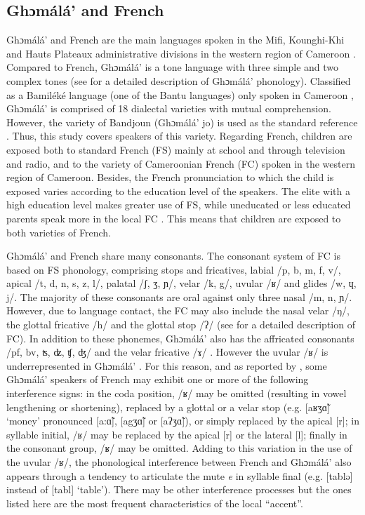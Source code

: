 \documentclass[output=paper,newtxmath,modfonts,nonflat,draftmode]{langsci/langscibook}
\begin{document}
\subsection{Ghɔmálá’ and French} %

Ghɔmálá’ and French are the main languages spoken in the Mifi, Kounghi-Khi and Hauts Plateaux administrative divisions in the western region of Cameroon \citep{Breton1991}. Compared to French, Ghɔmálá’ is a tone language with three simple and two complex tones (see \citet{Nissim1981} for a detailed description of Ghɔmálá’ phonology). Classified as a Bamiléké language (one of the Bantu languages) only spoken in Cameroon \citep{Dieu1983}, Ghɔmálá’ is comprised of 18 dialectal varieties with mutual comprehension. However, the variety of Bandjoun (Ghɔmálá’ jo) is used as the standard reference \citep{Domche1991}. Thus, this study covers speakers of this variety. Regarding French, children are exposed both to standard French (FS) mainly at school and through television and radio, and to the variety of Cameroonian French (FC) spoken in the western region of Cameroon. Besides, the French pronunciation to which the child is exposed varies according to the education level of the speakers. The elite with a high education level makes greater use of FS, while uneducated or less educated parents speak more in the local FC \citep{Biloa2004}. This means that children are exposed to both varieties of French. 

Ghɔmálá’ and French share many consonants. The consonant system of FC is based on FS phonology, comprising stops and fricatives, labial /p, b, m, f, v/, apical /t, d, n, s, z, l/, palatal /ʃ, ʒ, ɲ/, velar /k, g/, uvular /ʁ/ and glides /w, ɥ, j/. The majority of these consonants are oral against only three nasal /m, n, ɲ/. However, due to language contact, the FC may also include the nasal velar /ŋ/, the glottal fricative /h/ and the glottal stop /ʔ/ (see \citet{Biloa2004} for a detailed description of FC). In addition to these phonemes, Ghɔmálá’ also has the affricated consonants /pf, bv, ʦ, ʣ, ʧ, ʤ/ and the velar fricative /ɤ/ \citep{Mba1995}. However the uvular /ʁ/ is underrepresented in Ghɔmálá’ \citep{Mba1995}. For this reason, and as reported by \citet{Biloa2004}, some Ghɔmálá’ speakers of French may exhibit one or more of the following interference signs: in the coda position, /ʁ/ may be omitted (resulting in vowel lengthening or shortening), replaced by a glottal or a velar stop (e.g. [aʁʒɑ̃] `money' pronounced [a:ɑ̃], [agʒɑ̃] or [aʔʒɑ̃]), or simply replaced by the apical [r]; in syllable initial, /ʁ/ may be replaced by the apical [r] or the lateral [l]; finally in the consonant group, /ʁ/ may be omitted. Adding to this variation in the use of the uvular /ʁ/, the phonological interference between French and Ghɔmálá’ also appears through a tendency to articulate the mute \textit{e} in syllable final (e.g. [tablə] instead of [tabl] `table'). There may be other interference processes but the ones listed here are the most frequent characteristics of the local ``accent''.\pagebreak
\end{document}
